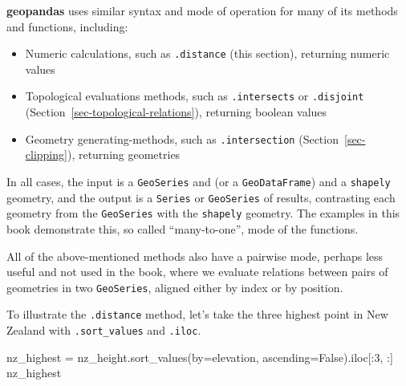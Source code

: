\documentclass[
  letterpaper,
]{krantz}
\newenvironment{Shaded}{\begin{snugshade}}{\end{snugshade}}
\newcommand{\DecValTok}[1]{\textcolor[rgb]{0.68,0.00,0.00}{#1}}
\newcommand{\NormalTok}[1]{\textcolor[rgb]{0.00,0.23,0.31}{#1}}
\newcommand{\OperatorTok}[1]{\textcolor[rgb]{0.37,0.37,0.37}{#1}}
\newcommand{\StringTok}[1]{\textcolor[rgb]{0.13,0.47,0.30}{#1}}
\newcommand{\VariableTok}[1]{\textcolor[rgb]{0.07,0.07,0.07}{#1}}
\providecommand{\tightlist}{%
  \setlength{\itemsep}{0pt}\setlength{\parskip}{0pt}}\usepackage{longtable,booktabs,array}
\begin{document}
\begin{tcolorbox}[enhanced jigsaw, title=\textcolor{quarto-callout-note-color}{\faInfo}\hspace{0.5em}{Note}, coltitle=black, colbacktitle=quarto-callout-note-color!10!white, breakable, titlerule=0mm, colframe=quarto-callout-note-color-frame, opacitybacktitle=0.6, colback=white, bottomrule=.15mm, left=2mm, leftrule=.75mm, toprule=.15mm, toptitle=1mm, bottomtitle=1mm, arc=.35mm, opacityback=0, rightrule=.15mm]

\textbf{geopandas} uses similar syntax and mode of operation for many of
its methods and functions, including:

\begin{itemize}
\tightlist
\item
  Numeric calculations, such as \texttt{.distance} (this section),
  returning numeric values
\item
  Topological evaluations methods, such as \texttt{.intersects} or
  \texttt{.disjoint} (Section~\ref{sec-topological-relations}),
  returning boolean values
\item
  Geometry generating-methods, such as \texttt{.intersection}
  (Section~\ref{sec-clipping}), returning geometries
\end{itemize}

In all cases, the input is a \texttt{GeoSeries} and (or a
\texttt{GeoDataFrame}) and a \texttt{shapely} geometry, and the output
is a \texttt{Series} or \texttt{GeoSeries} of results, contrasting each
geometry from the \texttt{GeoSeries} with the \texttt{shapely} geometry.
The examples in this book demonstrate this, so called ``many-to-one'',
mode of the functions.

All of the above-mentioned methods also have a pairwise mode, perhaps
less useful and not used in the book, where we evaluate relations
between pairs of geometries in two \texttt{GeoSeries}, aligned either by
index or by position.

\end{tcolorbox}

To illustrate the \texttt{.distance} method, let's take the three
highest point in New Zealand with \texttt{.sort\_values} and
\texttt{.iloc}.

\begin{Shaded}
\begin{Highlighting}[]
\NormalTok{nz\_highest }\OperatorTok{=}\NormalTok{ nz\_height.sort\_values(by}\OperatorTok{=}\StringTok{\textquotesingle{}elevation\textquotesingle{}}\NormalTok{, ascending}\OperatorTok{=}\VariableTok{False}\NormalTok{).iloc[:}\DecValTok{3}\NormalTok{, :]}
\NormalTok{nz\_highest}
\end{Highlighting}
\end{Shaded}
\end{document}
